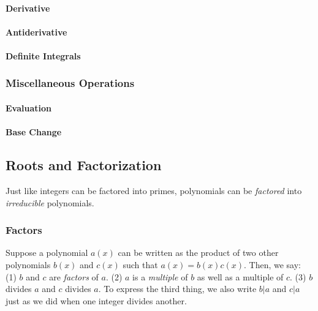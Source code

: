 \paragraph{Derivative}

\paragraph{Antiderivative}

\paragraph{Definite Integrals}


\subsubsection{Miscellaneous Operations}

\paragraph{Evaluation}

\paragraph{Base Change}



\subsection{Roots and Factorization}
Just like integers can be factored into primes, polynomials can be \emph{factored} into \emph{irreducible} polynomials.




\subsubsection{Factors} 
Suppose a polynomial $a(x)$ can be written as the product of two other polynomials $b(x)$ and $c(x)$ such that $a(x) = b(x) c(x)$. Then, we say: (1) $b$ and $c$ are \emph{factors} of $a$. (2) $a$ is a \emph{multiple} of $b$ as well as a multiple of $c$. (3) $b$ divides $a$ and $c$ divides $a$. To express the third thing, we also write $b|a$ and $c|a$ just as we did when one integer divides another.

